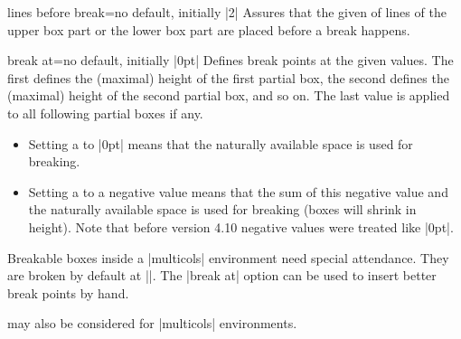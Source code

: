 \begin{docTcbKey}{lines before break}{=}{no default, initially |2|}
  Assures that the given  of lines of the upper box part or
  the lower box part are placed before a break happens.
\end{docTcbKey}

\clearpage
\begin{docTcbKey}[][doc updated=2017-07-05]{break at}{=}{no default, initially |0pt|}
  Defines break points at the given  values.
  The first  defines the (maximal) height of the first partial box,
  the second  defines the (maximal) height of the second partial box,
  and so on. The last  value is applied to all following partial boxes if any.
  \begin{itemize}
  \item Setting a  to |0pt| means that the naturally available
        space is used for breaking.
  \item Setting a  to a negative value means that
        the sum of this negative value and the naturally available space is used
        for breaking (boxes will shrink in height).
        Note that before version 4.10 negative values were treated like |0pt|.
  \end{itemize}
\begin{dispExample}
\begin{multicols}{3}\footnotesize
Breakable boxes inside a |multicols| environment need special attendance.
They are broken by default at |\textheight|.
The |break at| option can be used to insert better break points by hand.
\begin{tcolorbox}[enhanced jigsaw,size=small,vfill before first,
  colframe=red,colback=yellow!10!white,before title=\raggedright,
  title={Broken box inside a |multicols| environment},fonttitle=\bfseries,
  enforce breakable,%
  pad at break=1mm,break at=3cm/6.3cm ]
\lipsum[1]
\end{tcolorbox}
 may also be considered for |multicols| environments.
\end{multicols}
\end{dispExample}
\end{docTcbKey}

\enlargethispage*{1cm}

